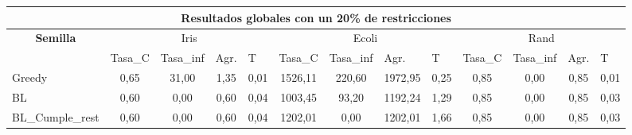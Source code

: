 \documentclass[12pt, spanish]{article}
\begin{document}
\begin{table}[H]
\begin{adjustwidth}{-1.9cm}{-1.9cm}
\begin{tabular}{|l|c|c|c|c|c|c|c|c|c|c|c|c|}
\hline
\multicolumn{13}{|c|}{\textbf{Resultados globales con un 20\% de restricciones}}                                                                                                                                                                                                                                                                                                                                       \\ \hline
\multicolumn{1}{|c|}{\multirow{2}{*}{\textbf{Semilla}}} & \multicolumn{4}{c|}{Iris}                                                                                          & \multicolumn{4}{c|}{Ecoli}                                                                                         & \multicolumn{4}{c|}{Rand}                                                                                          \\ \cline{2-13} 
\multicolumn{1}{|c|}{}                                  & \multicolumn{1}{l|}{Tasa\_C} & \multicolumn{1}{l|}{Tasa\_inf} & \multicolumn{1}{l|}{Agr.} & \multicolumn{1}{l|}{T} & \multicolumn{1}{l|}{Tasa\_C} & \multicolumn{1}{l|}{Tasa\_inf} & \multicolumn{1}{l|}{Agr.} & \multicolumn{1}{l|}{T} & \multicolumn{1}{l|}{Tasa\_C} & \multicolumn{1}{l|}{Tasa\_inf} & \multicolumn{1}{l|}{Agr.} & \multicolumn{1}{l|}{T} \\ \hline
Greedy                                                  & 0,65                         & 31,00                          & 1,35                      & 0,01                   & 1526,11                      & 220,60                         & 1972,95                   & 0,25                   & 0,85                         & 0,00                           & 0,85                      & 0,01                   \\ \hline
BL                                                      & 0,60                         & 0,00                           & 0,60                      & 0,04                   & 1003,45                      & 93,20                          & 1192,24                   & 1,29                   & 0,85                         & 0,00                           & 0,85                      & 0,03                   \\ \hline
BL\_Cumple\_rest                                        & 0,60                         & 0,00                           & 0,60                      & 0,04                   & 1202,01                      & 0,00                           & 1202,01                   & 1,66                   & 0,85                         & 0,00                           & 0,85                      & 0,03                   \\ \hline

\end{tabular}
\end{adjustwidth}
\end{table}
\end{document}
